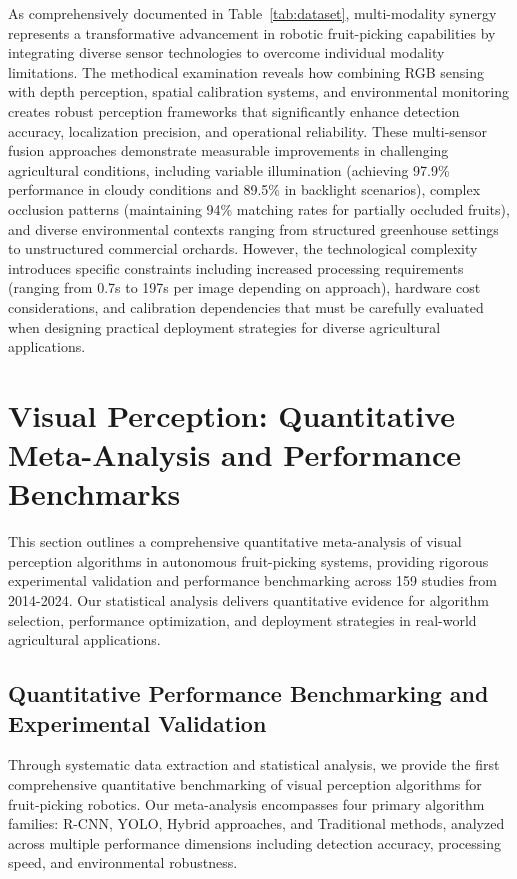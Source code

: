 \documentclass{ieeeaccess}
\begin{document}
As comprehensively documented in Table~\ref{tab:dataset}, multi-modality synergy represents a transformative advancement in robotic fruit-picking capabilities by integrating diverse sensor technologies to overcome individual modality limitations. The methodical examination reveals how combining RGB sensing with depth perception, spatial calibration systems, and environmental monitoring creates robust perception frameworks that significantly enhance detection accuracy, localization precision, and operational reliability. These multi-sensor fusion approaches demonstrate measurable improvements in challenging agricultural conditions, including variable illumination (achieving 97.9\% performance in cloudy conditions and 89.5\% in backlight scenarios), complex occlusion patterns (maintaining 94\% matching rates for partially occluded fruits), and diverse environmental contexts ranging from structured greenhouse settings to unstructured commercial orchards. However, the technological complexity introduces specific constraints including increased processing requirements (ranging from 0.7s to 197s per image depending on approach), hardware cost considerations, and calibration dependencies that must be carefully evaluated when designing practical deployment strategies for diverse agricultural applications.

\section{Visual Perception: Quantitative Meta-Analysis and Performance Benchmarks}
This section outlines a comprehensive quantitative meta-analysis of visual perception algorithms in autonomous fruit-picking systems, providing rigorous experimental validation and performance benchmarking across 159 studies from 2014-2024. Our statistical analysis delivers quantitative evidence for algorithm selection, performance optimization, and deployment strategies in real-world agricultural applications.

\subsection{Quantitative Performance Benchmarking and Experimental Validation}
Through systematic data extraction and statistical analysis, we provide the first comprehensive quantitative benchmarking of visual perception algorithms for fruit-picking robotics. Our meta-analysis encompasses four primary algorithm families: R-CNN, YOLO, Hybrid approaches, and Traditional methods, analyzed across multiple performance dimensions including detection accuracy, processing speed, and environmental robustness.
\end{document}
